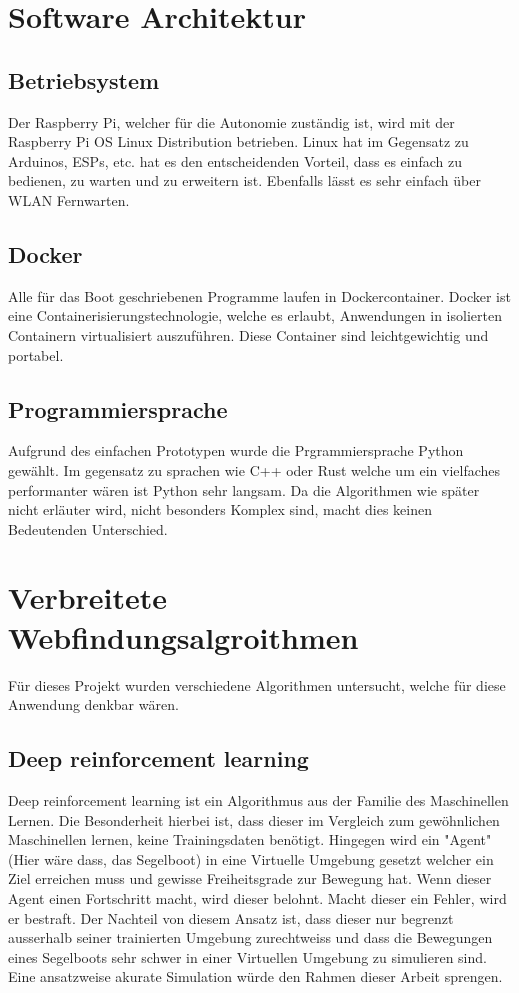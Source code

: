 \section{Software Architektur}
\subsection*{Betriebsystem}
Der Raspberry Pi, welcher für die Autonomie zuständig ist, wird mit der Raspberry Pi OS Linux Distribution betrieben. Linux hat im Gegensatz zu Arduinos, ESPs, etc. hat es den entscheidenden Vorteil, dass es einfach zu bedienen, zu warten und zu erweitern ist. Ebenfalls lässt es sehr einfach über WLAN Fernwarten. 

\subsection*{Docker}
Alle für das Boot geschriebenen Programme laufen in Dockercontainer. Docker ist eine Containerisierungstechnologie, welche es erlaubt, Anwendungen in isolierten Containern virtualisiert auszuführen. Diese Container sind leichtgewichtig und portabel.

\subsection*{Programmiersprache}
Aufgrund des einfachen Prototypen wurde die Prgrammiersprache Python gewählt. Im gegensatz zu sprachen wie C++ oder Rust welche um ein vielfaches performanter wären ist Python sehr langsam. Da die Algorithmen wie später nicht erläuter wird, nicht besonders Komplex sind, macht dies keinen Bedeutenden Unterschied. 


\section{Verbreitete Webfindungsalgroithmen}
Für dieses Projekt wurden verschiedene Algorithmen untersucht, welche für diese Anwendung denkbar wären.

\subsection{Deep reinforcement learning}
Deep reinforcement learning ist ein Algorithmus aus der Familie des Maschinellen Lernen. Die Besonderheit hierbei ist, dass dieser im Vergleich zum gewöhnlichen Maschinellen lernen, keine Trainingsdaten benötigt. Hingegen wird ein "Agent" (Hier wäre dass, das Segelboot) in eine Virtuelle Umgebung gesetzt welcher ein Ziel erreichen muss und gewisse Freiheitsgrade zur Bewegung hat. Wenn dieser Agent einen Fortschritt macht, wird dieser belohnt. Macht dieser ein Fehler, wird er bestraft. 
Der Nachteil von diesem Ansatz ist, dass dieser nur begrenzt ausserhalb seiner trainierten Umgebung zurechtweiss und dass die Bewegungen eines Segelboots sehr schwer in einer Virtuellen Umgebung zu simulieren sind. Eine ansatzweise akurate Simulation würde den Rahmen dieser Arbeit sprengen.


